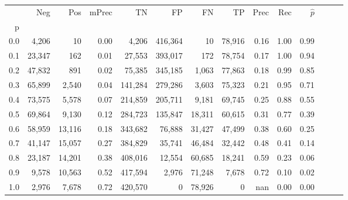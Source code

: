 \begin{tabular}{rrrrrrrrrrrrrr}
\toprule
{} &     Neg &     Pos & mPrec &       TN &       FP &      FN &      TP &  Prec &   Rec & $\hat{p}$ \\
p   &         &         &       &          &          &         &         &       &       &           \\
\midrule
0.0 &   4,206 &      10 &  0.00 &    4,206 &  416,364 &      10 &  78,916 &  0.16 &  1.00 &      0.99 \\
0.1 &  23,347 &     162 &  0.01 &   27,553 &  393,017 &     172 &  78,754 &  0.17 &  1.00 &      0.94 \\
0.2 &  47,832 &     891 &  0.02 &   75,385 &  345,185 &   1,063 &  77,863 &  0.18 &  0.99 &      0.85 \\
0.3 &  65,899 &   2,540 &  0.04 &  141,284 &  279,286 &   3,603 &  75,323 &  0.21 &  0.95 &      0.71 \\
0.4 &  73,575 &   5,578 &  0.07 &  214,859 &  205,711 &   9,181 &  69,745 &  0.25 &  0.88 &      0.55 \\
0.5 &  69,864 &   9,130 &  0.12 &  284,723 &  135,847 &  18,311 &  60,615 &  0.31 &  0.77 &      0.39 \\
0.6 &  58,959 &  13,116 &  0.18 &  343,682 &   76,888 &  31,427 &  47,499 &  0.38 &  0.60 &      0.25 \\
0.7 &  41,147 &  15,057 &  0.27 &  384,829 &   35,741 &  46,484 &  32,442 &  0.48 &  0.41 &      0.14 \\
0.8 &  23,187 &  14,201 &  0.38 &  408,016 &   12,554 &  60,685 &  18,241 &  0.59 &  0.23 &      0.06 \\
0.9 &   9,578 &  10,563 &  0.52 &  417,594 &    2,976 &  71,248 &   7,678 &  0.72 &  0.10 &      0.02 \\
1.0 &   2,976 &   7,678 &  0.72 &  420,570 &        0 &  78,926 &       0 &   nan &  0.00 &      0.00 \\
\bottomrule
\end{tabular}
